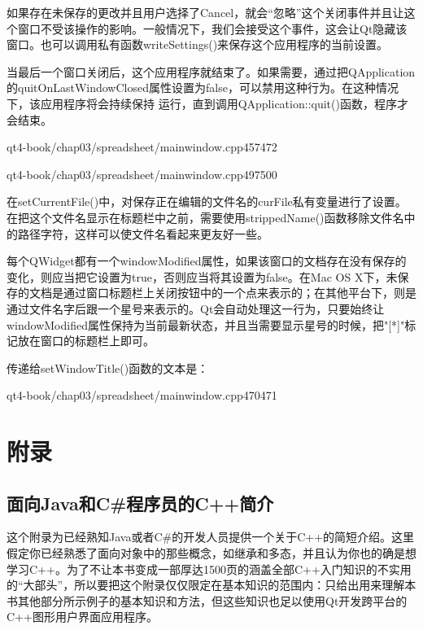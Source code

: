 \documentclass[11pt,oneside]{book}
\begin{document}
\begin{common-format}
如果存在未保存的更改并且用户选择了Cancel，就会“忽略”这个关闭事件并且让这个窗口不受该操作的影响。一般情况下，我们会接受这个事件，这会让Qt隐藏该窗口。也可以调用私有函数writeSettings()来保存这个应用程序的当前设置。

当最后一个窗口关闭后，这个应用程序就结束了。如果需要，通过把QApplication的quitOnLastWindowClosed属性设置为false，可以禁用这种行为。在这种情况下，该应用程序将会持续保持
运行，直到调用QApplication::quit()函数，程序才会结束。
\begin{cppline}{qt4-book/chap03/spreadsheet/mainwindow.cpp}{457}{472}
\end{cppline}
\begin{cppline}{qt4-book/chap03/spreadsheet/mainwindow.cpp}{497}{500}
\end{cppline}


在setCurrentFile()中，对保存正在编辑的文件名的curFile私有变量进行了设置。在把这个文件名显示在标题栏中之前，需要使用strippedName()函数移除文件名中的路径字符，这样可以使文件名看起来更友好一些。   

每个QWidget都有一个windowModified属性，如果该窗口的文档存在没有保存的变化，则应当把它设置为true，否则应当将其设置为false。在Mac OS X下，未保存的文档是通过窗口标题栏上关闭按钮中的一个点来表示的；在其他平台下，则是通过文件名字后跟一个星号来表示的。Qt会自动处理这一行为，只要始终让windowModified属性保持为当前最新状态，并且当需要显示星号的时候，把"[*]"标记放在窗口的标题栏上即可。

传递给setWindowTitle()函数的文本是：
\begin{cppline}{qt4-book/chap03/spreadsheet/mainwindow.cpp}{470}{471}
\end{cppline}





\appendix

\part{附录}
\chapter{面向Java和C\#{}程序员的C++简介}
这个附录为已经熟知Java或者C\#{}的开发人员提供一个关于C++的简短介绍。这里假定你已经熟悉了面向对象中的那些概念，如继承和多态，并且认为你也的确是想学习C++。为了不让本书变成一部厚达1500页的涵盖全部C++入门知识的不实用的“大部头”，所以要把这个附录仅仅限定在基本知识的范围内：只给出用来理解本书其他部分所示例子的基本知识和方法，但这些知识也足以使用Qt开发跨平台的C++图形用户界面应用程序。


\end{common-format}
\end{document}
